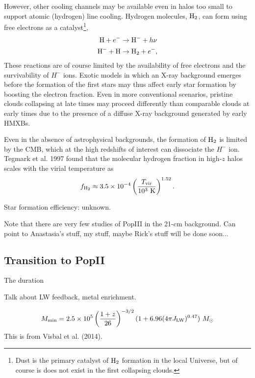 However, other cooling channels may be available even in halos too small to support atomic (hydrogen) line cooling. Hydrogen molecules, $\text{H}_2$, can form using free electrons as a catalyst\footnote{Dust is the primary catalyst of $\text{H}_2$ formation in the local Universe, but of course is does not exist in the first collapsing clouds.}, 
\begin{align}
	\text{H} + e^- & \rightarrow \text{H}^- + h\nu \\
	\text{H}^- + \text{H} & \rightarrow \text{H}_2 + e^- ,
\end{align}
These reactions are of course limited by the availability of free electrons and the survivability of $H^-$ ions. Exotic models in which an X-ray background emerges before the formation of the first stars may thus affect early star formation by boosting the electron fraction. Even in more conventional scenarios, pristine clouds collapsing at late times may proceed differently than comparable clouds at early times due to the presence of a diffuse X-ray background generated by early HMXBs. 

Even in the absence of astrophysical backgrounds, the formation of $\text{H}_2$ is limited by the CMB, which at the high redshifts of interest can dissociate the $H^-$ ion. Tegmark et al. 1997 found that the molecular hydrogen fraction in high-$z$ halos scales with the virial temperature as
\begin{equation}
	f_{\text{H}_2} \approx 3.5 \times 10^{-4} \left(\frac{T_{\text{vir}}}{10^3 \ \mathrm{K}} \right)^{1.52} .
\end{equation}



Star formation efficiency: unknown.


{\color{red} Note that there are very few studies of PopIII in the 21-cm background.} Can point to Anastasia's stuff, my stuff, maybe Rick's stuff will be done soon...


\subsection{Transition to PopII} \label{sec:PopIII2PopII}
The duration 

Talk about LW feedback, metal enrichment.

\begin{equation}
	M_{\min} = 2.5 \times 10^5 \left(\frac{1+z}{26} \right)^{-3/2} (1 + 6.96(4\pi \JLW)^{0.47})  \ \Msun
\end{equation}
This is from Visbal et al. (2014).


